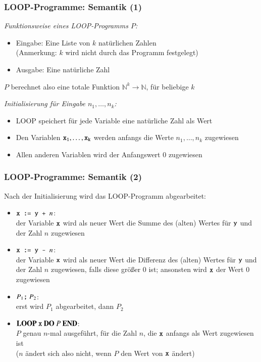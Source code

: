 \documentclass[onlymath]{beamer}
\begin{document}
\begin{frame}\frametitle{LOOP-Programme: Semantik (1)}

\emph{Funktionsweise eines LOOP-Programms $P$:}
\begin{itemize}
\item \alert{Eingabe:} Eine Liste von $k$ natürlichen Zahlen\\
(Anmerkung: $k$ wird nicht durch das Programm festgelegt)
\item \alert{Ausgabe:} Eine natürliche Zahl
\end{itemize}
$P$ berechnet also eine totale Funktion $\mathbb{N}^k\to \mathbb{N}$, für beliebige $k$
\bigskip\pause

\emph{Initialisierung für Eingabe $n_1,\ldots,n_k$:}
\begin{itemize}
\item LOOP speichert für jede Variable eine natürliche Zahl als Wert
\item Den Variablen $\texttt{x}_{\texttt{1}},\ldots,\texttt{x}_{\texttt{k}}$ werden anfangs die Werte $n_1,\ldots,n_k$ zugewiesen
\item Allen anderen Variablen wird der Anfangswert $0$ zugewiesen

\end{itemize}

\end{frame}

\begin{frame}\frametitle{LOOP-Programme: Semantik (2)}

Nach der Initialisierung wird das LOOP-Programm abgearbeitet:
\begin{itemize}
\item $\texttt{x} \texttt{ := } \texttt{y} \texttt{ + } n$:\\
der Variable $\texttt{x}$ wird als neuer Wert die Summe des (alten) Wertes für $\texttt{y}$ und der Zahl $n$ zugewiesen
\item $\texttt{x} \texttt{ := } \texttt{y} \texttt{ - } n$:\\
der Variable $\texttt{x}$ wird als neuer Wert die Differenz des (alten) Wertes für $\texttt{y}$ und der Zahl $n$ zugewiesen, falls diese größer $0$ ist; ansonsten wird $\texttt{x}$ der Wert $0$ zugewiesen
\item $P_1\texttt{;}{}~P_2$:\\
erst wird $P_1$ abgearbeitet, dann $P_2$
\item $\textbf{LOOP}~\texttt{x}~\textbf{DO}~P~\textbf{END}{}$:\\
$P$ genau $n$-mal ausgeführt, für die Zahl $n$, die $\texttt{x}$ anfangs als Wert zugewiesen ist\\
\textcolor{devilscss}{($n$ ändert sich also nicht, wenn $P$ den Wert von $\texttt{x}$ ändert)}
\end{itemize}

\end{frame}
\end{document}
